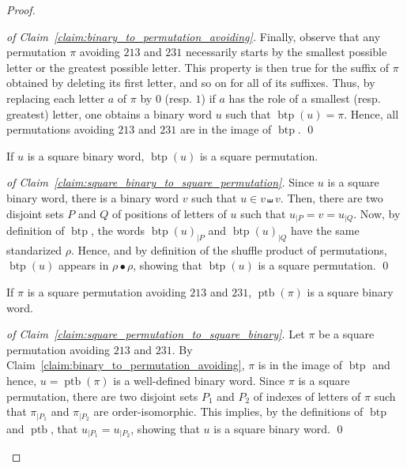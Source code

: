 \documentclass[a4paper]{llncs}
\DeclareMathOperator{\SHUFFLE}{\bullet}
\DeclareMathOperator{\BINTOPERM}{\mathrm{btp}}
\DeclareMathOperator{\PERMTOBIN}{\mathrm{ptb}}
\begin{document}
\begin{proof}
\begin{proof}[of Claim~\ref{claim:binary_to_permutation_avoiding}]
        Finally, observe that any permutation $\pi$ avoiding $213$ and
        $231$ necessarily starts by the smallest possible letter or the
        greatest possible letter. This property is then true for the
        suffix of $\pi$ obtained by deleting its first letter,
        and so on for all of its suffixes. Thus, by
        replacing each letter $a$ of $\pi$ by $0$ (resp. $1$) if $a$ has the
        role of a smallest (resp. greatest) letter, one obtains a binary
        word $u$ such that $\BINTOPERM(u) = \pi$. Hence, all permutations
        avoiding $213$ and $231$ are in the image of $\BINTOPERM$.
        \qed
    \end{proof}
    \begin{claim} \label{claim:square_binary_to_square_permutation}
        If $u$ is a square binary word, $\BINTOPERM(u)$ is a square
        permutation.
    \end{claim}
    \begin{proof}[of Claim~\ref{claim:square_binary_to_square_permutation}]
        Since $u$ is a square binary word, there is a binary word $v$
        such that $u \in v \shuffle v$. Then, there are two disjoint
        sets $P$ and $Q$ of positions of letters of $u$ such that
        $u_{|P} = v = u_{|Q}$. Now, by definition of $\BINTOPERM$, the
        words $\BINTOPERM(u)_{|P}$ and $\BINTOPERM(u)_{|Q}$ have the
        same standarized $\rho$. Hence, and by definition of the shuffle
        product of permutations, $\BINTOPERM(u)$ appears in
        $\rho \SHUFFLE \rho$, showing that $\BINTOPERM(u)$ is a square
        permutation.
        \qed
    \end{proof}
    \begin{claim} \label{claim:square_permutation_to_square_binary}
        If $\pi$ is a square permutation avoiding $213$ and $231$,
        $\PERMTOBIN(\pi)$ is a square binary word.
    \end{claim}
    \begin{proof}[of Claim~\ref{claim:square_permutation_to_square_binary}]
        Let $\pi$ be a square permutation avoiding $213$ and $231$. By
        Claim~\ref{claim:binary_to_permutation_avoiding}, $\pi$ is in
        the image of $\BINTOPERM$ and hence, $u = \PERMTOBIN(\pi)$ is a
        well-defined binary word. Since $\pi$ is a square permutation,
        there are two disjoint sets $P_1$ and $P_2$ of indexes of letters
        of $\pi$ such that $\pi_{|P_1}$ and $\pi_{|P_2}$ are
        order-isomorphic. This implies, by the definitions of $\BINTOPERM$
        and $\PERMTOBIN$, that $u_{|P_1} = u_{|P_2}$, showing that $u$
        is a square binary word.
        \qed
    \end{proof}
\end{proof}
\medskip
\end{document}
